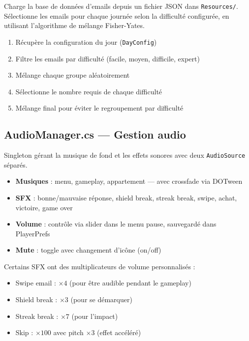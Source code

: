 \documentclass[12pt,a4paper]{article}
\begin{document}
Charge la base de données d'emails depuis un fichier JSON dans \texttt{Resources/}. Sélectionne les emails pour chaque journée selon la difficulté configurée, en utilisant l'algorithme de mélange Fisher-Yates.

\begin{tcolorbox}[title=Processus de sélection des emails]
\begin{enumerate}
    \item Récupère la configuration du jour (\texttt{DayConfig})
    \item Filtre les emails par difficulté (facile, moyen, difficile, expert)
    \item Mélange chaque groupe aléatoirement
    \item Sélectionne le nombre requis de chaque difficulté
    \item Mélange final pour éviter le regroupement par difficulté
\end{enumerate}
\end{tcolorbox}

\subsection{AudioManager.cs — Gestion audio}

Singleton gérant la musique de fond et les effets sonores avec deux \texttt{AudioSource} séparés.

\begin{itemize}
    \item \textbf{Musiques} : menu, gameplay, appartement — avec crossfade via DOTween
    \item \textbf{SFX} : bonne/mauvaise réponse, shield break, streak break, swipe, achat, victoire, game over
    \item \textbf{Volume} : contrôle via slider dans le menu pause, sauvegardé dans PlayerPrefs
    \item \textbf{Mute} : toggle avec changement d'icône (on/off)
\end{itemize}

Certains SFX ont des multiplicateurs de volume personnalisés :
\begin{itemize}
    \item Swipe email : $\times 4$ (pour être audible pendant le gameplay)
    \item Shield break : $\times 3$ (pour se démarquer)
    \item Streak break : $\times 7$ (pour l'impact)
    \item Skip : $\times 100$ avec pitch $\times 3$ (effet accéléré)
\end{itemize}
\end{document}
